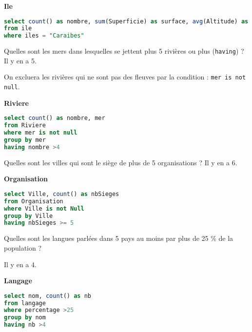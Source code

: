 {\bf Ile} 
\begin{Answer}
\begin{lstlisting}[language=SQL]
select count() as nombre, sum(Superficie) as surface, avg(Altitude) as altitude 
from ile
where iles = "Caraibes"
\end{lstlisting}
\end{Answer}
\begin{Exercise}
Quelles sont les mers dans lesquelles se jettent plus 5 rivières ou plus (\texttt{having}) ? Il y en a 5.

On excluera les rivières qui ne sont pas des fleuves par la condition : \texttt{mer is not null}.
\end{Exercise}
{\bf Riviere}
\begin{Answer}
\begin{lstlisting}[language=SQL]
select count() as nombre, mer
from Riviere
where mer is not null
group by mer
having nombre >4
\end{lstlisting}
\end{Answer}
\begin{Exercise}
Quelles sont les villes qui sont le siège de plus de 5 organisations ?
Il y en a 6.
\end{Exercise}
{\bf Organisation}
\begin{Answer}
\begin{lstlisting}[language=SQL]
select Ville, count() as nbSieges 
from Organisation
where Ville is not Null
group by Ville
having nbSieges >= 5
\end{lstlisting}
\end{Answer}
\begin{Exercise}
Quelles sont les langues parlées dans 5 pays au moins par plus de 25 \% de la population ?

Il y en a 4.
\end{Exercise}
{\bf Langage}
\begin{Answer}
\begin{lstlisting}[language=SQL]
select nom, count() as nb
from langage
where percentage >25
group by nom
having nb >4\end{lstlisting}
\end{Answer}
